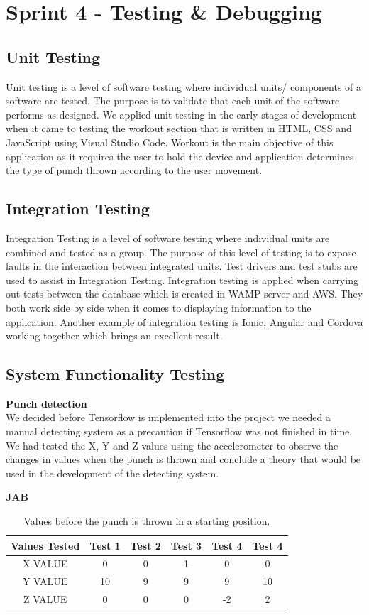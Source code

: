 \documentclass[a4paper,12pt]{report}
\begin{document}
\section{Sprint 4 - Testing \& Debugging}
\subsection{Unit Testing}
Unit testing is a level of software testing where individual units/ components of a software are tested. The purpose is to validate that each unit of the software performs as designed.\cite{unitTesting}
We applied unit testing in the early stages of development when it came to testing the workout section that is written in HTML, CSS and JavaScript using Visual Studio Code. Workout is the main objective of this application as it requires the user to hold the device and application determines the type of punch thrown according to the user movement.
\subsection{Integration Testing}
Integration Testing is a level of software testing where individual units are combined and tested as a group. The purpose of this level of testing is to expose faults in the interaction between integrated units. Test drivers and test stubs are used to assist in Integration Testing.\cite{integrationTesting}
Integration testing is applied when carrying out tests between the database which is created in WAMP server and AWS. They both work side by side when it comes to displaying information to the application. Another example of integration testing is Ionic, Angular and Cordova working together which brings an excellent result.
\newpage
\subsection{System Functionality Testing}
\textbf{Punch detection}\\
We decided before Tensorflow is implemented into the project we needed a manual detecting system as a precaution if Tensorflow was not finished in time. We had tested the X, Y and Z values using the accelerometer to observe the changes in values when the punch is thrown and conclude a theory that would be used in the development of the detecting system.
\begin{center}
    \textbf{JAB}
\end{center}{}
\begin{table}[h]
    \centering
    \begin{tabular}{||c c c c c c||} 
     \hline
     \textbf{Values Tested} & \textbf{Test 1} & \textbf{Test 2} & \textbf{Test 3} & \textbf{Test 4} & \textbf{Test 4} \\ [0.5ex] 
     \hline\hline
     X VALUE & 0 & 0 & 1 & 0 & 0\\ 
     \hline
     Y VALUE & 10 & 9 & 9 & 9 & 10\\  
     \hline
     Z VALUE & 0 & 0 & 0 & -2 & 2\\
     \hline
    \end{tabular}
    \caption{Values before the punch is thrown in a starting position.}
    \label{tab:jabBeforet}
\end{table}
\end{document}
